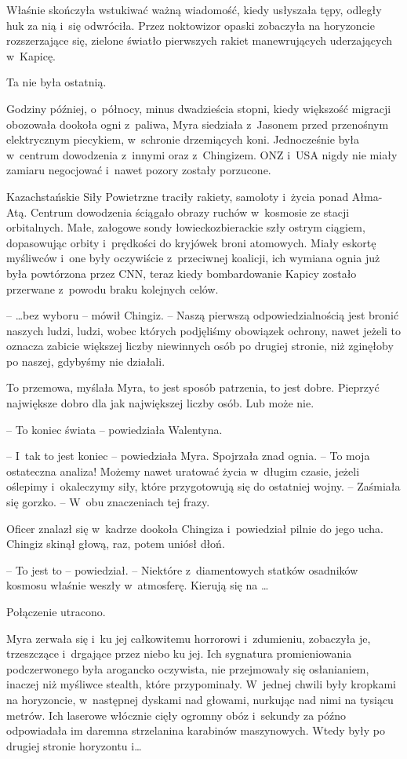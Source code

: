 \documentclass[oneside,polish,11pt,sfheadings]{mwbk}
\begin{document}
Właśnie skończyła wstukiwać ważną wiadomość, kiedy usłyszała tępy,
odległy huk za nią i~się odwróciła. Przez noktowizor opaski zobaczyła na
horyzoncie rozszerzające się, zielone światło pierwszych rakiet
manewrujących uderzających w~Kapicę.

Ta nie była ostatnią.

Godziny później, o~północy, minus dwadzieścia stopni, kiedy większość
migracji obozowała dookoła ogni z~paliwa, Myra siedziała z~Jasonem przed
przenośnym elektrycznym piecykiem, w~schronie drzemiących koni.
Jednocześnie była w~centrum dowodzenia z~innymi oraz z~Chingizem. ONZ i~USA nigdy nie miały zamiaru negocjować i~nawet pozory zostały porzucone.

Kazachstańskie Siły Powietrzne traciły rakiety, samoloty i~życia ponad
Ałma-Atą. Centrum dowodzenia ściągało obrazy ruchów w~kosmosie ze stacji
orbitalnych. Małe, załogowe sondy łowiecko\dywiz zbierackie szły ostrym
ciągiem, dopasowując orbity i~prędkości do kryjówek broni atomowych.
Miały eskortę myśliwców i~one były oczywiście z~przeciwnej koalicji, ich
wymiana ognia już była powtórzona przez CNN, teraz kiedy bombardowanie
Kapicy zostało przerwane z~powodu braku kolejnych celów.

-- \ldots bez wyboru -- mówił Chingiz. -- Naszą pierwszą odpowiedzialnością
jest bronić naszych ludzi, ludzi, wobec których podjęliśmy obowiązek
ochrony, nawet jeżeli to oznacza zabicie większej liczby niewinnych osób
po drugiej stronie, niż zginęłoby po naszej, gdybyśmy nie działali.

To przemowa, myślała Myra, to jest sposób patrzenia, to jest dobre.
Pieprzyć największe dobro dla jak największej liczby osób. Lub może nie.

-- To koniec świata -- powiedziała Walentyna.

-- I~tak to jest koniec -- powiedziała Myra. Spojrzała znad ognia. -- To
moja ostateczna analiza! Możemy nawet uratować życia w~długim czasie,
jeżeli oślepimy i~okaleczymy siły, które przygotowują się do ostatniej
wojny. -- Zaśmiała się gorzko. -- W~obu znaczeniach tej frazy.

Oficer znalazł się w~kadrze dookoła Chingiza i~powiedział pilnie do jego
ucha. Chingiz skinął głową, raz, potem uniósł dłoń.

-- To jest to -- powiedział. -- Niektóre z~diamentowych statków osadników
kosmosu właśnie weszły w~atmosferę. Kierują się na \ldots

Połączenie utracono.

Myra zerwała się i~ku jej całkowitemu horrorowi i~zdumieniu, zobaczyła
je, trzeszczące i~drgające przez niebo ku jej. Ich sygnatura
promieniowania podczerwonego była arogancko oczywista, nie przejmowały
się osłanianiem, inaczej niż myśliwce stealth, które przypominały. W~jednej chwili były kropkami na horyzoncie, w~następnej dyskami nad
głowami, nurkując nad nimi na tysiącu metrów. Ich laserowe włócznie
cięły ogromny obóz i~sekundy za późno odpowiadała im daremna strzelanina
karabinów maszynowych. Wtedy były po drugiej stronie horyzontu i\ldots
\end{document}
